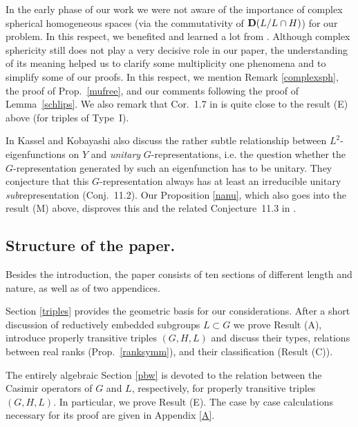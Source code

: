 \documentclass[10]{amsart}
\theoremstyle{remark}
\theoremstyle{definition}
\numberwithin{equation}{section}
\begin{document}
{In the early phase of our work we were not aware of the importance of complex spherical homogeneous spaces (via the commutativity of ${\bf D}(L/L\cap H)$) for our problem.
In this respect, we benefited and learned a lot from \cite{KK19}. Although complex sphericity still does not play a very decisive role in our paper, the understanding of its meaning helped us
to clarify some multiplicity one phenomena and to simplify some of our proofs. In this respect, we mention Remark \ref{complexsph}, the proof of Prop.~\ref{mufree}, and our comments following the proof of Lemma~\ref{schlips}. We also remark that Cor.~1.7  in  \cite{KK19} is quite close to the result (E) above (for triples of Type~I).

In \cite{KK25} Kassel and Kobayashi also discuss the rather subtle relationship between $L^2$-eigenfunctions on $Y$ and {\em unitary} $G$-representations, i.e. the question whether the $G$-representation generated by such an eigenfunction has to be unitary. They conjecture that this $G$-representation always has at least an irreducible unitary {\em sub}representation (Conj.~11.2).
Our Proposition \ref{nanu}, which also goes into the result (M) above, disproves this and the related Conjecture~11.3 in  \cite{KK25}. 

\subsection{Structure of the paper.}\label{sp} 

Besides the introduction, the paper consists of ten sections of different length and nature, as well as of two appendices. 

Section \ref{triples} provides the geometric basis for our considerations. After a short discussion of reductively embedded subgroups $L\subset G$ we prove Result (A), introduce properly
transitive triples $(G,H,L)$ and discuss their types, relations between real ranks (Prop.~\ref{ranksymm}), and their classification (Result (C)).

The entirely algebraic Section \ref{pbw} is devoted to the relation between the Casimir operators of $G$ and $L$, respectively, for properly transitive triples $(G,H,L)$. In particular,
we prove Result (E). The case by case calculations  necessary for its proof are given in Appendix \ref{A}.

}
\end{document}
